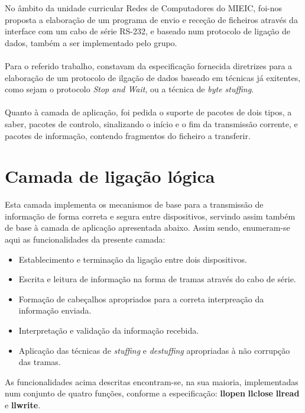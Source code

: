 \documentclass{article}
\begin{document}
No âmbito da unidade curricular Redes de Computadores do MIEIC, foi-nos proposta a elaboração de um programa de envio e receção de ficheiros através da interface com um cabo de série RS-232, e baseado num protocolo de ligação de dados, também a ser implementado pelo grupo.\\\\
Para o referido trabalho, constavam da especificação fornecida diretrizes para a elaboração de um protocolo de ilgação de dados baseado em técnicas já exitentes, como sejam o protocolo \textit{Stop and Wait}, ou a técnica de \textit{byte stuffing}. \\\\%
Quanto à camada de aplicação, foi pedida o suporte de pacotes de dois tipos, a saber, pacotes de controlo, sinalizando o início e o fim da transmissão corrente, e pacotes de informação, contendo fragmentos do ficheiro a transferir.

\newpage

\section{Camada de ligação lógica}
Esta camada implementa os mecanismos de base para a transmissão de informação de forma correta e segura entre dispositivos, servindo assim também de base à camada de aplicação apresentada abaixo. %
Assim sendo, enumeram-se aqui as funcionalidades da presente camada:

\begin{itemize}
    \item Establecimento e terminação da ligação entre dois dispositivos.
    \item Escrita e leitura de informação na forma de tramas através do cabo de série.
    \item Formação de cabeçalhos apropriados para a correta interpreação da informação enviada.
    \item Interpretação e validação da informação recebida.
    \item Aplicação das técnicas de \textit{stuffing} e \textit{destuffing} apropriadas à não corrupção das tramas.
\end{itemize}
As funcionalidades acima descritas encontram-se, na sua maioria, implementadas num conjunto de quatro funções, conforme a especificação: \textbf{llopen} \textbf{llclose} \textbf{llread} e \textbf{llwrite}.\\
\end{document}
